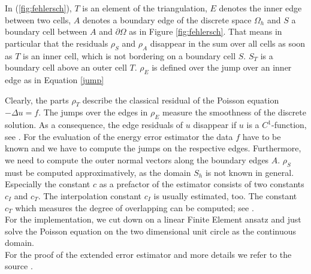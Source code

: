 \documentclass[a4paper, 11pt, twoside]{article}
\begin{document}
In  (\ref{fig:fehlersch}), $T$ is an element of the triangulation, $E$ denotes the inner edge between two cells,
$A$ denotes a boundary edge of the discrete space $\Omega_h$ and $S$ a boundary cell between $A$ and $\partial\Omega$ as in Figure \ref{fig:fehlersch}.
That means in particular that the residuals $\rho_{S}$ and $\rho_A$ disappear in the sum over all cells as soon as $T$ is an inner cell, which is not bordering on a boundary cell $S$.
$S_T$ is a boundary cell above an outer cell $T$.
$\rho_E$ is defined over the jump over an inner edge as in Equation \ref{jump}

Clearly, the parts $\rho_T$ describe the classical residual of the Poisson equation $-\Delta u = f$.
The jumps over the edges in $\rho_E$ measure the smoothness of the discrete solution. As a consequence, the edge residuals of $u$
disappear if $u$ is a $C^1$-function, see \cite[page 91]{richterskript}.
For the evaluation of the energy error estimator the data $f$ have to be known and we have to compute the jumps on the respective edges.
Furthermore, we need to compute the outer normal vectors along the boundary edges $A$.
$\rho_S$ must be computed approximatively, as the domain $S_h$ is not known in general.
Especially the constant $c$ as a prefactor of the estimator consists of two constants $c_I$ and $c_T$.
The interpolation constant $c_I$ is usually estimated, too.
The constant $c_T$ which measures the degree of overlapping can be computed; see \cite[page 91]{richterskript}.\\
For the implementation, we cut down on a linear Finite Element ansatz and just solve the Poisson equation on the two dimensional unit circle as the continuous domain.\\

For the proof of the extended error estimator and more details we refer to the source \cite[page 18]{bachelor}.
\end{document}
